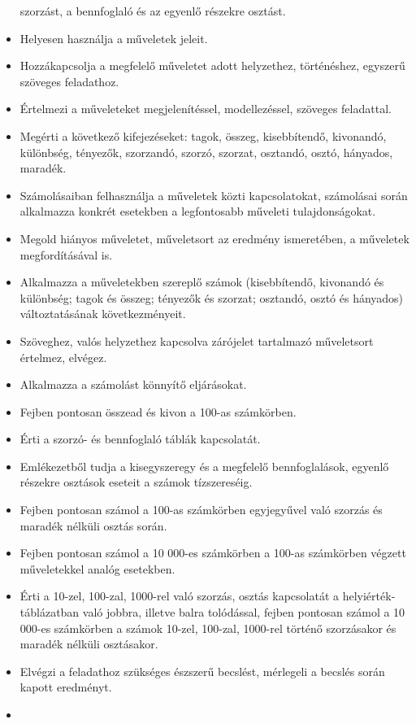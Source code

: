 \begin{itemize}
  szorzást, a bennfoglaló és az egyenlő részekre osztást.
\item
  Helyesen használja a műveletek jeleit.
\item
  Hozzákapcsolja a megfelelő műveletet adott helyzethez, történéshez,
  egyszerű szöveges feladathoz.
\item
  Értelmezi a műveleteket megjelenítéssel, modellezéssel, szöveges
  feladattal.
\item
  Megérti a következő kifejezéseket: tagok, összeg, kisebbítendő,
  kivonandó, különbség, tényezők, szorzandó, szorzó, szorzat, osztandó,
  osztó, hányados, maradék.
\item
  Számolásaiban felhasználja a műveletek közti kapcsolatokat, számolásai
  során alkalmazza konkrét esetekben a legfontosabb műveleti
  tulajdonságokat.
\item
  Megold hiányos műveletet, műveletsort az eredmény ismeretében, a
  műveletek megfordításával is.
\item
  Alkalmazza a műveletekben szereplő számok (kisebbítendő, kivonandó és
  különbség; tagok és összeg; tényezők és szorzat; osztandó, osztó és
  hányados) változtatásának következményeit.
\item
  Szöveghez, valós helyzethez kapcsolva zárójelet tartalmazó műveletsort
  értelmez, elvégez.
\item
  Alkalmazza a számolást könnyítő eljárásokat.
\item
  Fejben pontosan összead és kivon a 100-as számkörben.
\item
  Érti a szorzó- és bennfoglaló táblák kapcsolatát.
\item
  Emlékezetből tudja a kisegyszeregy és a megfelelő bennfoglalások,
  egyenlő részekre osztások eseteit a számok tízszereséig.
\item
  Fejben pontosan számol a 100-as számkörben egyjegyűvel való szorzás és
  maradék nélküli osztás során.
\item
  Fejben pontosan számol a 10 000-es számkörben a 100-as számkörben
  végzett műveletekkel analóg esetekben.
\item
  Érti a 10-zel, 100-zal, 1000-rel való szorzás, osztás kapcsolatát a
  helyiérték-táblázatban való jobbra, illetve balra tolódással, fejben
  pontosan számol a 10 000-es számkörben a számok 10-zel, 100-zal,
  1000-rel történő szorzásakor és maradék nélküli osztásakor.
\item
  Elvégzi a feladathoz szükséges észszerű becslést, mérlegeli a becslés
  során kapott eredményt.
\item

\end{itemize}
